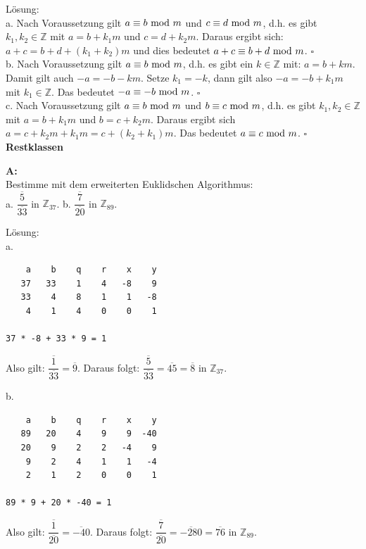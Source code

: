 \documentclass[landscape,twocolumn,a4paper]{article}
\begin{document}
Lösung: \\
a. Nach Voraussetzung gilt $a \equiv b \text{ mod } m$ und $c \equiv d \text{ mod } m$, d.h. es gibt $k_1, k_2 \in 
\mathbb{Z}$ mit $a = b + k_1m$ und $c = d + k_2m$. Daraus  ergibt sich: $a + c = b + d + (k_1 + k_2)m$ und 
dies bedeutet $a + c \equiv b +d \text{ mod } m$. \hfill $\square{}$ \\
b. Nach Voraussetzung gilt $a \equiv b \text{ mod } m$, d.h. es gibt ein $k \in \mathbb{Z}$ mit: $a = b + km$. Damit 
gilt auch $-a = -b - km$. Setze $k_1 = -k$, dann gilt also $-a = -b + k_1m$ mit $k_1 \in \mathbb{Z}$.
Das bedeutet $-a \equiv -b \text{ mod } m$. \hfill $\square{}$ \\
c. Nach Voraussetzung gilt $a \equiv b \text{ mod } m$ und $b \equiv c \text{ mod } m$, d.h. es gibt $k_1, k_2 \in 
\mathbb{Z}$ mit $a = b + k_1m$ und $b = c + k_2m$. Daraus ergibt sich $a =c + k_2m + k_1m = c +(k_2+k_1)m$.
Das bedeutet $a \equiv c \text{ mod } m$. \hfill $\square{}$ \\

 \textbf{Restklassen} \bigskip

\textbf{A:}   \\
Bestimme mit dem erweiterten Euklidschen Algorithmus: \\
 a.  $\dfrac{\overline{5}}{\overline{33}}$ in  $\mathbb{Z}_{37}$. \quad
 b.  $\dfrac{\overline{7}}{\overline{20}}$ in  $\mathbb{Z}_{89}$.
\bigskip {}

Lösung: \\
a.
\begin{lstlisting}
    a    b    q    r    x    y
   37   33    1    4   -8    9
   33    4    8    1    1   -8
    4    1    4    0    0    1

37 * -8 + 33 * 9 = 1
\end{lstlisting}   
Also gilt: $\dfrac{\overline{1}}{\overline{33}} = \overline{9}$. Daraus folgt: $\dfrac{\overline{5}}{\overline{33}} =  \overline{45} = \overline{8}$ in  $\mathbb{Z}_{37}$.

 
b.
\begin{lstlisting}
    a    b    q    r    x    y
   89   20    4    9    9  -40
   20    9    2    2   -4    9
    9    2    4    1    1   -4
    2    1    2    0    0    1

89 * 9 + 20 * -40 = 1
\end{lstlisting}   
Also gilt: $\dfrac{\overline{1}}{\overline{20}} = \overline{-40}$. Daraus folgt: $\dfrac{\overline{7}}{\overline{20}} =  \overline{-280} = \overline{76}$ in  $\mathbb{Z}_{89}$. \\
\end{document}
